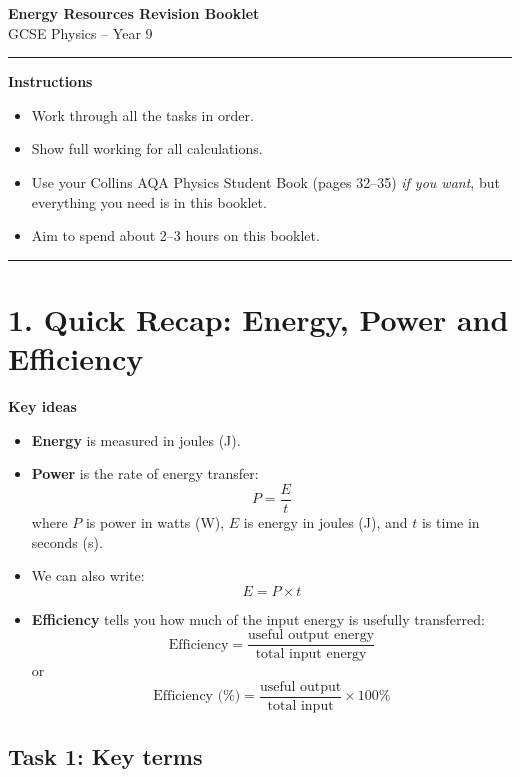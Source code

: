 \documentclass[11pt,a4paper]{article}
\begin{document}
\begin{center}
    {\LARGE \textbf{Energy Resources Revision Booklet}}\\[0.2cm]
    {\large GCSE Physics -- Year 9}
\end{center}

\hrule
\vspace{0.5cm}

\textbf{Instructions}

\begin{itemize}[noitemsep]
    \item Work through all the tasks in order.
    \item Show full working for all calculations.
    \item Use your Collins AQA Physics Student Book (pages 32--35) \emph{if you want}, but everything you need is in this booklet.
    \item Aim to spend about 2--3 hours on this booklet.
\end{itemize}

\hrule
\vspace{0.5cm}

\section*{1. Quick Recap: Energy, Power and Efficiency}

\textbf{Key ideas}

\begin{itemize}[noitemsep]
    \item \textbf{Energy} is measured in joules (J).
    \item \textbf{Power} is the rate of energy transfer:
    \[
        P = \frac{E}{t}
    \]
    where $P$ is power in watts (W), $E$ is energy in joules (J), and $t$ is time in seconds (s).
    \item We can also write:
    \[
        E = P \times t
    \]
    \item \textbf{Efficiency} tells you how much of the input energy is usefully transferred:
    \[
        \text{Efficiency} = \frac{\text{useful output energy}}{\text{total input energy}}
    \]
    or
    \[
        \text{Efficiency (\%)} = \frac{\text{useful output}}{\text{total input}} \times 100\%
    \]
\end{itemize}

\subsection*{Task 1: Key terms}
\end{document}
